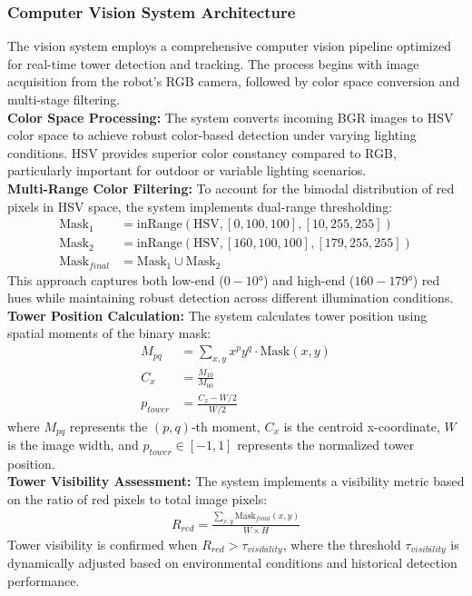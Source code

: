 \subsubsection{Computer Vision System Architecture}
The vision system employs a comprehensive computer vision pipeline optimized for real-time tower detection and tracking. The process begins with image acquisition from the robot's RGB camera, followed by color space conversion and multi-stage filtering.\\
\textbf{Color Space Processing:}
The system converts incoming BGR images to HSV color space to achieve robust color-based detection under varying lighting conditions. HSV provides superior color constancy compared to RGB, particularly important for outdoor or variable lighting scenarios.\\
\textbf{Multi-Range Color Filtering:} To account for the bimodal distribution of red pixels in HSV space, the system implements dual-range thresholding:
\begin{align}
    \text{Mask}_1 &= \text{inRange}(\text{HSV}, [0, 100, 100], [10, 255, 255]) \\
    \text{Mask}_2 &= \text{inRange}(\text{HSV}, [160, 100, 100], [179, 255, 255]) \\
    \text{Mask}_{final} &= \text{Mask}_1 \cup \text{Mask}_2
\end{align}
This approach captures both low-end ($0-10$°) and high-end ($160-179$°) red hues while maintaining robust detection across different illumination conditions.\\
\textbf{Tower Position Calculation:}
The system calculates tower position using spatial moments of the binary mask:
\begin{align}
M_{pq} &= \sum_{x,y} x^p y^q \cdot \text{Mask}(x,y) \\
C_x &= \frac{M_{10}}{M_{00}} \\
p_{tower} &= \frac{C_x - W/2}{W/2}
\end{align}
where $M_{pq}$ represents the $(p,q)$-th moment, $C_x$ is the centroid x-coordinate, $W$ is the image width, and $p_{tower} \in [-1,1]$ represents the normalized tower position.\\
\textbf{Tower Visibility Assessment:}
The system implements a visibility metric based on the ratio of red pixels to total image pixels:
\begin{align}
R_{red} = \frac{\sum_{x,y} \text{Mask}_{final}(x,y)}{W \times H}
\end{align}
Tower visibility is confirmed when $R_{red} > \tau_{visibility}$, where the threshold $\tau_{visibility}$ is dynamically adjusted based on environmental conditions and historical detection performance.
